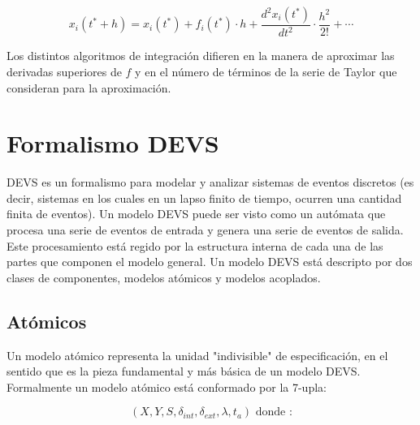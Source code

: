 \documentclass[a4paper,	11pt]{report}
\begin{document}
\begin{equation} \label{eq4}
x_i(t^* + h) = x_i(t^*) + f_i(t^*) \cdot h + \frac{d^{2}x_i (t^*)}{dt^2} \cdot \frac{h^2}{2!} + \cdots
\end{equation}

Los distintos algoritmos de integración difieren en la manera de aproximar las derivadas superiores de $f$ y en el número de términos de la serie de Taylor que consideran para la aproximación.

\section{Formalismo DEVS}
DEVS es un formalismo para modelar y analizar sistemas de eventos discretos (es decir, sistemas en los cuales en un lapso finito de tiempo, ocurren una cantidad finita de eventos).
Un modelo DEVS puede ser visto como un autómata que procesa una serie de eventos de entrada y genera una serie de eventos de salida. Este procesamiento está regido por la estructura interna de cada una de las partes que componen el modelo general.
Un modelo DEVS está descripto por dos clases de componentes, modelos atómicos y modelos acoplados.

\subsection{Atómicos}
Un modelo atómico representa la unidad "indivisible" de especificación, en el sentido que es la pieza fundamental y más básica de un modelo DEVS. Formalmente un modelo atómico está conformado por la 7-upla:

\begin{equation} 
(X, Y, S, \delta_{int} , \delta_{ext}, \lambda, t_{a}) \mbox{ donde :}
\end{equation}
\end{document}
